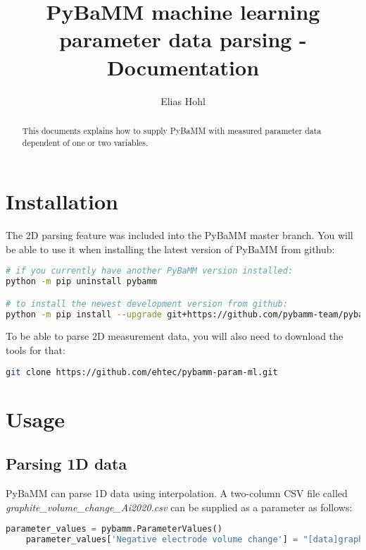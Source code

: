 \documentclass[]{report}
\title{PyBaMM machine learning parameter data parsing - Documentation}
\author{Elias Hohl}
\begin{document}
\maketitle

\begin{abstract}
	This documents explains how to supply PyBaMM with measured parameter data dependent of one or two variables.
\end{abstract}

\section{Installation}

The 2D parsing feature was included into the PyBaMM master branch. You will be able to use it when installing the latest version of PyBaMM from github:

\begin{lstlisting}[language=bash]
# if you currently have another PyBaMM version installed:
python -m pip uninstall pybamm

# to install the newest development version from github:
python -m pip install --upgrade git+https://github.com/pybamm-team/pybamm
\end{lstlisting}

To be able to parse 2D measurement data, you will also need to download the tools for that:

\begin{lstlisting}[language=bash]
git clone https://github.com/ehtec/pybamm-param-ml.git
\end{lstlisting}

\section{Usage}

\subsection{Parsing 1D data}

PyBaMM can parse 1D data using interpolation. A two-column CSV file called \textit{graphite\_volume\_change\_Ai2020.csv} can be supplied as a parameter as follows:

\begin{lstlisting}[language=python]
	parameter_values = pybamm.ParameterValues()
	parameter_values['Negative electrode volume change'] = "[data]graphite_volume_change_Ai2020"
\end{lstlisting}
\end{document}

